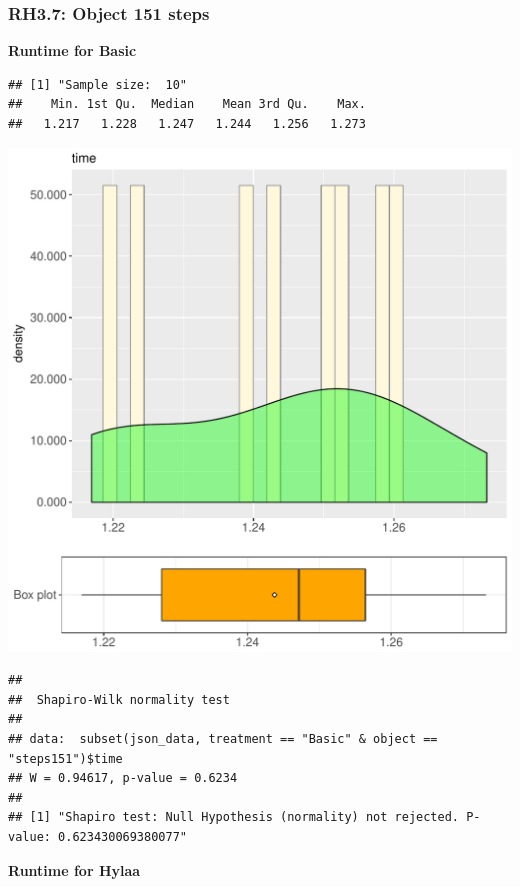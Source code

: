 \documentclass{article}\usepackage[]{graphicx}\usepackage[]{color}
\makeatletter
\def\maxwidth{ %
  \ifdim\Gin@nat@width>\linewidth
    \linewidth
  \else
    \Gin@nat@width
  \fi
}
\newenvironment{kframe}{%
 \def\at@end@of@kframe{}%
 \ifinner\ifhmode%
  \def\at@end@of@kframe{\end{minipage}}%
  \begin{minipage}{\columnwidth}%
 \fi\fi%
 \def\FrameCommand##1{\hskip\@totalleftmargin \hskip-\fboxsep
 \colorbox{shadecolor}{##1}\hskip-\fboxsep
     \hskip-\linewidth \hskip-\@totalleftmargin \hskip\columnwidth}%
 \MakeFramed {\advance\hsize-\width
   \@totalleftmargin\z@ \linewidth\hsize
   \@setminipage}}%
 {\par\unskip\endMakeFramed%
 \at@end@of@kframe}
\newenvironment{knitrout}{}{} %
\makeatother
\begin{document}
\subsubsection{RH3.7: Object 151 steps}

 \textbf{Runtime for Basic}
\begin{knitrout}
\color{fgcolor}\begin{kframe}
\begin{verbatim}
## [1] "Sample size:  10"
##    Min. 1st Qu.  Median    Mean 3rd Qu.    Max. 
##   1.217   1.228   1.247   1.244   1.256   1.273
\end{verbatim}
\end{kframe}
\includegraphics[width=\maxwidth]{figure/RH3_Basic_steps151-1} 
\begin{kframe}\begin{verbatim}
## 
## 	Shapiro-Wilk normality test
## 
## data:  subset(json_data, treatment == "Basic" & object == "steps151")$time
## W = 0.94617, p-value = 0.6234
## 
## [1] "Shapiro test: Null Hypothesis (normality) not rejected. P-value: 0.623430069380077"
\end{verbatim}
\end{kframe}
\end{knitrout}
 \textbf{Runtime for Hylaa}
\end{document}
